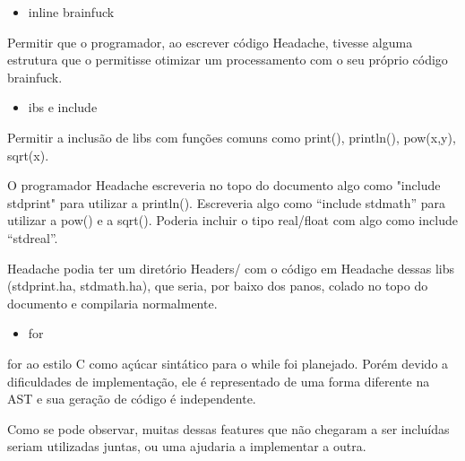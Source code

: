 \begin{itemize}
    \item inline brainfuck
\end{itemize}

Permitir que o programador, ao escrever código Headache, tivesse alguma estrutura que o permitisse otimizar um processamento com o seu próprio código brainfuck.

\begin{itemize}
    \item ibs e include
\end{itemize}

Permitir a inclusão de libs com funções comuns como print(), println(), pow(x,y), sqrt(x). 

O programador Headache escreveria no topo do documento algo como "include stdprint" para utilizar a println(). Escreveria algo como “include stdmath” para utilizar a pow() e a sqrt(). Poderia incluir o tipo real/float  com algo como include “stdreal”.

Headache podia ter um diretório Headers/ com o código em Headache dessas libs (stdprint.ha, stdmath.ha), que seria, por baixo dos panos, colado no topo do documento e compilaria normalmente.

\begin{itemize}
    \item for
\end{itemize}

for ao estilo C como açúcar sintático para o while foi planejado. Porém devido a dificuldades de implementação, ele é representado de uma forma diferente na AST e sua geração de código é independente. \newline


Como se pode observar, muitas dessas features que não chegaram a ser incluídas seriam utilizadas juntas, ou uma ajudaria a implementar a outra.
